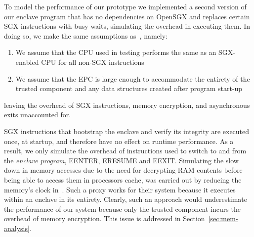\documentclass[../../../main.tex]{subfiles}
\begin{document}
To model the performance of our prototype we implemented a second
version of our enclave program that has no dependencies on OpenSGX and
replaces certain SGX instructions with busy waits, simulating the
overhead in executing them. In doing so, we make the same assumptions
as~\cite{Baumann14}, namely:
\begin{enumerate}
  \item We assume that the CPU used in testing performs the same as an
    SGX-enabled CPU for all non-SGX instructions
  \item We assume that the EPC is large enough to accommodate the
    entirety of the trusted component and any data structures created
    after program start-up
\end{enumerate}
leaving the overhead of SGX instructions, memory encryption, and
asynchronous exits unaccounted for.

SGX instructions that bootstrap the enclave and verify its integrity
are executed once, at startup, and therefore have no effect on runtime
performance. As a result, we only simulate the overhead of
instructions used to switch to and from the \textit{enclave program},
EENTER, ERESUME and EEXIT. Simulating the slow down in memory accesses
due to the need for decrypting RAM contents before being able to
access them in processors cache, was carried out by reducing the
memory's clock in~\cite{Baumann14}. Such a proxy works for their
system because it executes within an enclave in its entirety. Clearly,
such an approach would underestimate the performance of our system
because only the trusted component incurs the overhead of memory
encryption. This issue is addressed in Section~\ref{sec:mem-analysis}.
\end{document}
